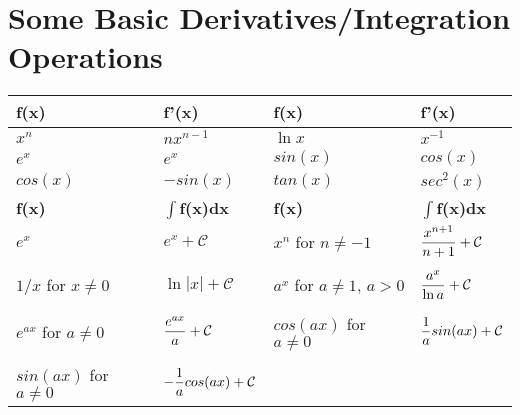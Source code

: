 \section{Some Basic Derivatives/Integration Operations}\label{Appendix_Calculus:Section:BasicDerivationIntegration}

\begin{center}
  \begin{tabular}{|| l l | l l ||}
    \hline\hline
       {\bf f(x)}  & {\bf f'(x)}  & {\bf f(x)}  & {\bf f'(x)}  \\
    \hline\hline
       $x^{n}$      &  $nx^{n-1}$   & $\ln{x}$    & $x^{-1}$      \\
       $e^{x}$      &  $e^{x}$      & $sin(x)$   & $cos(x)$     \\
       $cos(x)$    &  $-sin(x)$   & $tan(x)$    & $sec^{2}(x)$  \\
    \hline\hline
       {\bf f(x)}  &  {\bf $\int$f(x)dx} & {\bf f(x)}  &  {\bf $\int$f(x)dx} \\
    \hline\hline
       $e^{x}$      & $e^{x}+\mathcal{C}$& $x^{n}$ for $n\neq -1$ & $\displaystyle\frac{x^{n+1}}{n+1}+\mathcal{C}$ \\
                    &                  &                        & \\
       $1/x$ for $x\neq 0$& $\ln{|x|}+\mathcal{C}$ & $a^{x}$ for $a\neq 1$, $a>0$ & $\displaystyle\frac{a^{x}}{\ln{a}}+\mathcal{C}$\\
                   &                  &                         & \\
       $e^{ax}$ for $a\neq 0$  & $\displaystyle\frac{e^{ax}}{a}+\mathcal{C}$ & $cos(ax)$ for $a\neq0$ & $\displaystyle\frac{1}{a}sin(ax)+\mathcal{C}$\\
                   &                  &                        & \\
       $sin(ax)$ for $a\neq 0$ & $-\displaystyle\frac{1}{a}cos(ax)+\mathcal{C}$& & \\
    \hline\hline
  \end{tabular}
\end{center}

